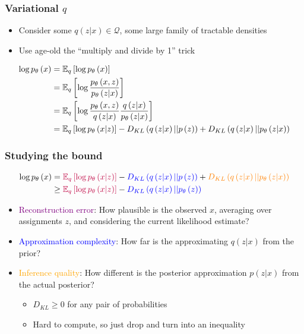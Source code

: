 \documentclass[10pt,mathserif]{beamer}
\begin{document}
\begin{frame}
  \frametitle{Variational $q$}
  \begin{itemize}
  \item Consider some $q\left(z \vert x\right) \in \mathcal{Q}$, some large
    family of tractable densities
  \item Use age-old the ``multiply and divide by 1'' trick
  \end{itemize}
  \begin{align*}
    \log p_{\theta}\left(x\right) &= \mathbb{E}_{q}\left[{\log p_{\theta}\left(x\right)}\right] \\
    &= \mathbb{E}_{q}\left[{\log \frac{p_{\theta}\left(x, z\right)}{p_{\theta}\left(z \vert x\right)}}\right] \\
    &= \mathbb{E}_{q}\left[{\log \frac{p_{\theta}\left(x, z\right)}{q\left(z \vert x\right)} \frac{q\left(z \vert x\right)}{p_{\theta}\left(z \vert x\right)}}\right] \\
    &= \mathbb{E}_{q}\left[{\log p_{\theta}\left(x \vert z\right)}\right] - D_{KL}\left(q\left(z \vert x\right) \vert \vert p\left(z\right)\right) + D_{KL}\left(q\left(z \vert x\right) \vert \vert p_{\theta}\left(z \vert x\right)\right)
  \end{align*}
\end{frame}

\begin{frame}
  \frametitle{Studying the bound}
  \begin{align*}
    \log p_{\theta}\left(x\right) &= \textcolor{purple}{\mathbb{E}_{q}\left[{\log p_{\theta}\left(x \vert z\right)}\right]} - \textcolor{blue}{D_{KL}\left(q\left(z \vert x\right) \vert \vert p\left(z\right)\right)} + \textcolor{orange}{D_{KL}\left(q\left(z \vert x\right) \vert \vert p_{\theta}\left(z \vert x\right)\right)} \\
     &\geq \textcolor{purple}{\mathbb{E}_{q}\left[{\log p_{\theta}\left(x \vert z\right)}\right]} - \textcolor{blue}{D_{KL}\left(q\left(z \vert x\right) \vert \vert p_{\theta}\left(z\right)\right)}
  \end{align*}
  \begin{itemize}
  \item \textcolor{purple}{Reconstruction error}: How plausible is the observed
    $x$, averaging over assignments $z$, and considering the current likelihood
    estimate?
  \item \textcolor{blue}{Approximation complexity}: How far is the approximating
    $q\left(z \vert x\right)$ from the prior?
  \item \textcolor{orange}{Inference quality}: How different is the
    posterior approximation $p\left(z \vert x\right)$
    from the actual posterior?
    \begin{itemize}
    \item $D_{KL} \geq 0$ for any pair of probabilities
    \item Hard to compute, so just drop and turn into an inequality
    \end{itemize}
  \end{itemize}
\end{frame}
\end{document}
